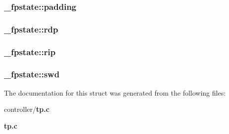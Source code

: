 \subsubsection[{padding}]{ {\bf \_\-fpstate::padding}}\label{struct__fpstate_aed67fd34324f71989cf0d481f42223f2}
\subsubsection[{rdp}]{ {\bf \_\-fpstate::rdp}}\label{struct__fpstate_aa3ba0728d97c2c78197be9289b1a0cba}
\subsubsection[{rip}]{ {\bf \_\-fpstate::rip}}\label{struct__fpstate_ad86906c13d5d3156a4205fa56cfde330}
\subsubsection[{swd}]{ {\bf \_\-fpstate::swd}}\label{struct__fpstate_a307673696074902c474a208513f5f779}


The documentation for this struct was generated from the following files:\begin{DoxyCompactItemize}
\item 
controller/{\bf tp.c}\item 
{\bf tp.c}\end{DoxyCompactItemize}
